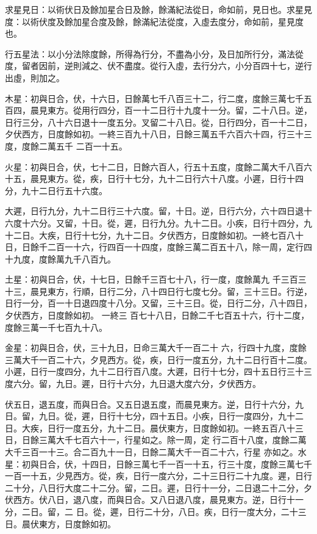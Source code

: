 \begin{pinyinscope}
 求星見日：以術伏日及餘加星合日及餘，餘滿紀法從日，命如前，見日也。求星見度：以術伏度及餘加星合度及餘，餘滿紀法從度，入虛去度分，命如前，星見度也。



 行五星法：以小分法除度餘，所得為行分，不盡為小分，及日加所行分，滿法從度，留者因前，逆則減之、伏不盡度。從行入虛，去行分六，小分百四十七，逆行出虛，則加之。



 木星：初與日合，伏，十六日，日餘萬七千八百三十二，行二度，度餘三萬七千五百四，晨見東方。從用行四分，百一十二日行十九度十一分。留，二十八日。逆，日行三分，八十六日退十一度五分。叉留二十八日。從，日行四分，百一十二日，夕伏西方，日度餘如初。一終三百九十八日，日餘三萬五千六百六十四，行三十三度，度餘二萬五千
 二百一十五。



 火星：初與日合，伏，七十二日，日餘六百人，行五十五度，度餘二萬大千八百六十五，晨見東方。從，疾，日行十七分，九十二日行六十八度。小遲，日行十四分，九十二日行五十六度。



 大遲，日行九分，九十二日行三十六度。留，十日。逆，日行六分，六十四日退十六度十六分。又留，十日。從，遲，日行九分。九十二日。小疾，日行十四分，九十二日。大疾，日行十七分，九十二日。夕伏西方，日度餘如初。一終七百八十日，日餘千二百一十六，行四百一十四度，度餘三萬二百五十八，除一周，定行四十九度，度餘萬九千八百九。



 土星：初與日合，伏，十七日，日餘千三百七十八，行一度，度餘萬九
 千三百三十三，晨見東方，行順，日行二分，八十四日行七度七分。留，三十三日。行逆，日行一分，百一十日退四度十八分。又留，三十三日。從，日行二分，八十四日，夕伏西方，日度餘如初。
 一終三
 百七十八日，日餘二千七百五十六，行十二度，度餘三萬一千七百九十八。



 金星：初與日合，伏，三十九日，日命三萬大千一百二十
 六，行四十九度，度餘三萬大千一百二十六，夕見西方。從，疾，日行一度五分，九十二日行百十二度。小遲，日行一度四分，九十二日行百八度。大遲，日行十七分，四十五日行三十三度六分。留，九日。遲，日行十六分，九日退大度六分，夕伏西方。



 伏五日，退五度，而與日合。又五日退五度，而晨見東方。逆，日行十六分，九日。留，九日。從，遲，日行十七分，四十五日。小疾，日行一度四分，九十二日。大疾，日行一度五分，九十二日。晨伏東方，日度餘如初。一終五百八十三日，日餘三萬大千七百六十一，行星如之。除一周，定
 行二百十八度，度餘二萬大千三百一十三。合二百九十一日，日餘二萬大千一百二十六，行星
 亦如之。水星：初與日合，伏，十四日，日餘三萬七千一百一十五，行三十度，度餘三萬七千一百一十五，少見西方。從，疾，日行一度六分，二十三日行二十九度。遲，日行二十分，八日行大度二十二分。留，二日。遲，日行十一分，二日退二十二分，夕伏西方。伏八日，退八度，而與日合。又八日退八度，晨見東方。逆，日行十一分，二日。留，二
 日。從，遲，日行二十分，八日。疾，日行一度大分，二十三日。晨伏東方，日度餘如初。




\end{pinyinscope}
